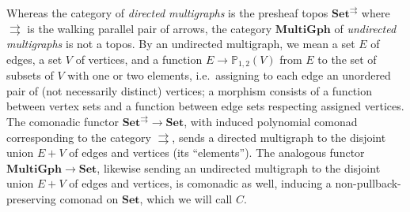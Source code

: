 \documentclass[11pt, oneside, article]{memoir}
\theoremstyle{plain}
\theoremstyle{definition}
\theoremstyle{remark}
\newcommand{\namedcat}[1]{\mathbf{#1}}
\newcommand{\Set}{\namedcat{Set}}
\newcommand{\MultiGph}{\namedcat{MultiGph}}
\newcommand{\fun}[2]{{#2}^{#1}}
\newcommand{\cmnd}[1]{{#1}}
\newcommand{\cC}{\cmnd{C}}
\begin{document}
Whereas the category of \emph{directed multigraphs} is the presheaf
topos $\fun{\rightrightarrows}{\Set}$ where $\rightrightarrows$ is the
walking parallel pair of arrows, the category $\MultiGph$ of
\emph{undirected multigraphs} is not a topos. By an undirected
multigraph, we mean a set $E$ of edges, a set $V$ of vertices, and a
function $E \to \mathbb{P}_{1,2}(V)$ from $E$ to the set of subsets of
$V$ with one or two elements, i.e.\ assigning to each edge an
unordered pair of (not necessarily distinct) vertices; a morphism
consists of a function between vertex sets and a function between edge
sets respecting assigned vertices.  The comonadic functor
$\fun{\rightrightarrows}{\Set} \to \Set$, with induced polynomial
comonad corresponding to the category $\rightrightarrows$, sends a
directed multigraph to the disjoint union $E + V$ of edges and
vertices (its ``elements''). The analogous functor
$\MultiGph \to \Set$, likewise sending an undirected multigraph to the
disjoint union $E + V$ of edges and vertices, is comonadic as well,
inducing a non-pullback-preserving comonad on $\Set$, which we will
call $\cC$.


\end{document}
